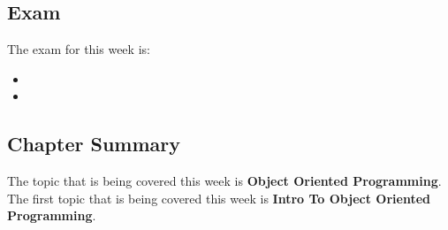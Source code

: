 \subsection{Exam}

The exam for this week is:

\begin{itemize}
    \item {}
    \item {}
\end{itemize}

\newpage

\subsection{Chapter Summary}

The topic that is being covered this week is \textbf{Object Oriented Programming}. The first topic that is being covered this week is \textbf{Intro To Object Oriented Programming}.

